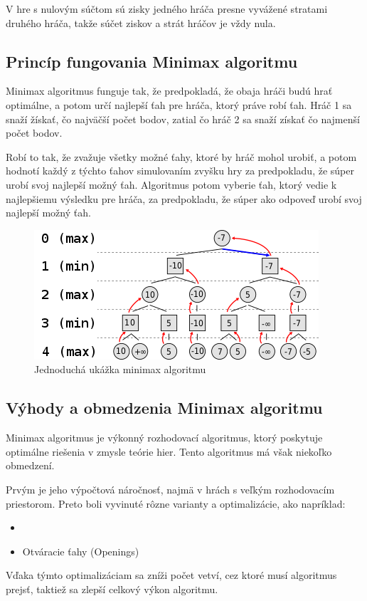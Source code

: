 \documentclass[10pt,twoside,slovak,a4paper]{article}
\begin{document}
V hre s nulovým súčtom sú zisky jedného hráča presne vyvážené stratami druhého hráča, takže súčet ziskov a strát hráčov je vždy nula. 

\subsection{Princíp fungovania Minimax algoritmu} \label{principMinimax}
Minimax algoritmus funguje tak, že predpokladá, že obaja hráči budú hrať optimálne, a potom určí najlepší ťah pre hráča, ktorý práve robí ťah. Hráč 1 sa snaží žískať, čo najväčší počet bodov, zatial čo hráč 2 sa snaží získať čo najmenší počet bodov.

Robí to tak, že zvažuje všetky možné ťahy, ktoré by hráč mohol urobiť, a potom hodnotí každý z týchto ťahov simulovaním zvyšku hry za predpokladu, že súper urobí svoj najlepší možný ťah. Algoritmus potom vyberie ťah, ktorý vedie k najlepšiemu výsledku pre hráča, za predpokladu, že súper ako odpoveď urobí svoj najlepší možný ťah.\cite{Minimax}
\begin{figure}[h]
    \centering
    \includegraphics[width=\textwidth]{minimax}
    \caption{Jednoduchá ukážka minimax algoritmu}
    \label{obr1}
\end{figure}

\subsection{Výhody a obmedzenia Minimax algoritmu} \label {vyhodyMinimax}

Minimax algoritmus je výkonný rozhodovací algoritmus, ktorý poskytuje optimálne riešenia v zmysle teórie hier. Tento algoritmus má však niekoľko obmedzení. 

Prvým je jeho výpočtová náročnosť, najmä v hrách s veľkým rozhodovacím priestorom. Preto boli vyvinuté rôzne varianty a optimalizácie, ako napríklad:
\begin{itemize}
\item {}
\item Otváracie ťahy (Openings) \cite{ChessOpenings}
\end{itemize}
Vďaka týmto optimalizáciam sa zníži počet vetví, cez ktoré musí algoritmus prejsť, taktiež sa zlepší celkový výkon algoritmu. 
\end{document}
